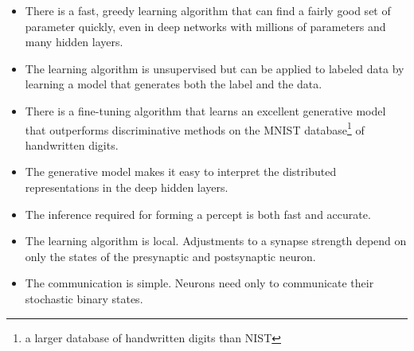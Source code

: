 \documentclass[a4paper,12pt,twocolumn]{article}
\begin{document}
\begin{itemize}
	\item There is a fast, greedy learning algorithm that can find a fairly good set of parameter quickly, even in deep networks with millions of parameters and many hidden layers.
	\item The learning algorithm is unsupervised but can be applied to labeled data by learning a model that generates both the label and the data.
	\item There is a fine-tuning algorithm that learns an excellent generative model that outperforms discriminative methods on the MNIST database\footnote{a larger database of handwritten digits than NIST} of handwritten digits.
	\item The generative model makes it easy to interpret the distributed representations in the deep hidden layers.
	\item The inference required for forming a percept is both fast and accurate.
	\item The learning algorithm is local. Adjustments to a synapse strength depend on only the states of the presynaptic and postsynaptic neuron.
	\item The communication is simple. Neurons need only to communicate their stochastic binary states.
\end{itemize}


\end{document}

